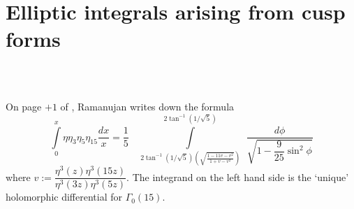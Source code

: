 \section{Elliptic integrals arising from cusp forms}\label{art8-sec3}
~

\subsection{}\label{art8-sec3.1}
On page  $+1$ of \cite{art8-key11}, Ramanujan writes down the formula 
$$
\int\limits^{x}_{0}\eta\eta_{3}\eta_{5}\eta_{15}\dfrac{dx}{x}=\dfrac{1}{5}\quad \int\limits^{2\tan^{-1}(1/\sqrt{5})}_{2\tan^{-1}(1/\sqrt{5})\left(\sqrt{\frac{1-11v-v^{2}}{1+v-v^{2}}}\right)} \ \ \dfrac{d\phi}{\sqrt{1-\dfrac{9}{25}\sin^{2}\phi}}
$$
where $v:=\dfrac{\eta^{3}(z)\eta^{3}(15z)}{\eta^{3}(3z)\eta^{3}(5z)}$. The integrand on the left hand side is the `unique' holomorphic differential for $\Gamma_{0}(15)$.

